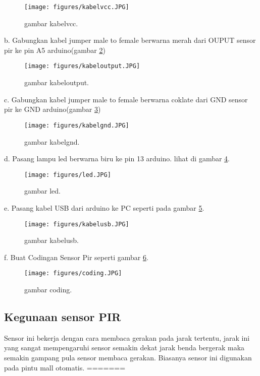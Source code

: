 \begin{figure} [ht]
\centerline{\texttt{[image: figures/kabelvcc.JPG]}}
\caption{gambar kabelvcc.}
\label{carakoneksikabelvcc}
\end{figure}

b. Gabungkan kabel jumper male to female berwarna merah dari OUPUT sensor pir ke pin A5 arduino(gambar \ref{ckkabeloutput})

\begin{figure} [ht]
\centerline{\texttt{[image: figures/kabeloutput.JPG]}}
\caption{gambar kabeloutput.}
\label{ckkabeloutput}
\end{figure}

c. Gabungkan kabel jumper male to female berwarna coklate dari GND sensor pir ke GND arduino(gambar \ref{ckkabelgnd})

\begin{figure} [ht]
\centerline{\texttt{[image: figures/kabelgnd.JPG]}}
\caption{gambar kabelgnd.}
\label{ckkabelgnd}
\end{figure}

d. Pasang lampu led berwarna biru ke pin 13 arduino. lihat di gambar \ref{ckled}.

\begin{figure} [ht]
\centerline{\texttt{[image: figures/led.JPG]}}
\caption{gambar led.}
\label{ckled}
\end{figure}

e. Pasang kabel USB dari arduino ke PC seperti pada gambar \ref{ckkabelusb}.

\begin{figure} [ht]
\centerline{\texttt{[image: figures/kabelusb.JPG]}}
\caption{gambar kabelusb.}
\label{ckkabelusb}
\end{figure}

f. Buat Codingan Sensor Pir seperti gambar \ref{coding}.

\begin{figure} [ht]
\centerline{\texttt{[image: figures/coding.JPG]}}
\caption{gambar coding.}
\label{coding}
\end{figure}

\subsection {Kegunaan sensor PIR}
Sensor ini bekerja dengan cara membaca gerakan pada jarak tertentu, jarak ini yang sangat mempengaruhi sensor semakin dekat jarak benda bergerak maka semakin gampang pula sensor membaca gerakan.
Biasanya sensor ini digunakan pada pintu mall otomatis.
=======

